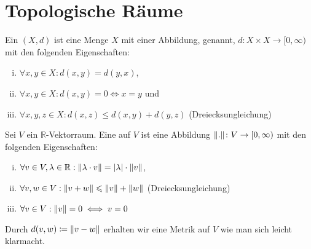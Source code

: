 
\newcommand{\fach}{Grundlagen der Analysis, Topologie, Geometrie}
\newcommand{\shortFach}{Analysis, Topologie, Geometrie}
\newcommand{\semester}{SoSe 2014}
\newcommand{\homepage}{https://wwwmath.uni-muenster.de/reine/u/topos/lehre/SS2014/AnaTopGeo/anatopgeo.html}

\newcommand{\prof}{Prof.\ Dr.\ Arthur Bartels}
\publishers{\scalebox{11}{\Huge$\pi_1$}}




\maketitle
\begin{abstract}

\end{abstract}

\tableofcontents
\cleardoubleoddemptypage

\setcounter{page}{1}
\setcounter{footnote}{0}

\section{Topologische Räume} %
\label{sec:top_raume}

\begin{definition}[label=def:metrischer,{name=[metrischer Raum]}]
	Ein  $(X,d)$ ist eine Menge $X$ mit einer Abbildung,  genannt,  $d \colon X \times X \to [0,\infty)$ mit den folgenden Eigenschaften:
	\begin{enumerate}[(i)]
		\item $\forall x,y \in X : d(x,y) = d(y,x)$,
		\item $\forall x,y \in X : d(x,y)=0 \iff x=y$ und
		\item $\forall x,y,z \in X : d(x,z) \le d(x,y) + d(y,z)$  (Dreiecksungleichung)
	\end{enumerate}
\end{definition}

\begin{definition}[{name=[Vektorraumnorm]}]
	Sei $V$ ein $\mathbb{R}$-Vektorraum. 
	Eine  auf $V$ ist eine Abbildung $\Vert.\Vert \colon V \to [0,\infty)$ mit den folgenden Eigenschaften:
	\begin{enumerate}[(i)]
		\item $\forall v \in V, \lambda  \in \mathbb{R} : \Vert\lambda  \cdot v\Vert = \lvert\lambda\rvert  \cdot \Vert v\Vert$,
		\item $\forall v,w \in V : \Vert v+w\Vert \leqslant \Vert v\Vert + \Vert w\Vert$ (Dreiecksungleichung)
		\item $\forall v \in V : \Vert v\Vert = 0 \iff v=0$
	\end{enumerate} 
	Durch $d(v,w) \coloneqq \Vert v-w\Vert $ erhalten wir eine Metrik auf $V$ wie man sich leicht klarmacht.
\end{definition}

